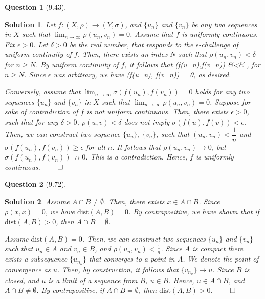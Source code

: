 \documentclass{article} %
\def\eQb#1\eQe{\begin{eqnarray*}#1\end{eqnarray*}}
\theoremstyle{quest}
\newtheorem*{question}{Question}
\newtheorem*{solution}{Solution}
\begin{document}
\begin{question}[9.43]
\end{question}
\begin{solution}
Let $f:(X,\rho ) \to (Y, \sigma)$,
and $\{ u_n \}$ and 
$\{ v_n \}$ be any two sequences in $X$ such that $\lim_{n\to \infty}
\rho (u_n , v_n) = 0$. Assume that $f$ is uniformly continuous.
Fix $\epsilon > 0$. Let $\delta > 0$ be the real number, that
responds to the $\epsilon$-challenge of uniform continuity of $f$.
Then, there exists an index $N$ such that 
$\rho(u_n, v_n) < \delta$ for $n \geq N$. 
By uniform continuity of $f$, it follows that
\eQb
\sigma(f(u_n),f(v_n)) &<& \epsilon,
\eQe
for $n \geq N$. Since $\epsilon$ was arbitrary, we have
\eQb
\underset{n \to \infty}{\lim} \sigma(f(u_n), f(v_n)) = 0,
\eQe
as desired. 

\smallskip

Conversely, assume that $\lim_{n \to \infty}
\sigma(f(u_n),f(v_n)) = 0$ holds for any two sequences 
$\{u_n\}$ and $\{ v_n \}$ in $X$ such that $\lim_{n \to \infty}
\rho(u_n,v_n) = 0$. 
Suppose for sake of contradiction of $f$ is not uniform continuous. 
Then, there exists $\epsilon > 0$, such that for any $\delta > 0$,
$\rho(u,v) < \delta$ does not imply  $\sigma(f(u),f(v)) < \epsilon$. 
Then, we can construct two sequence $\{u_n\}$, $\{v_n\}$, such that 
$(u_n, v_n) < \dfrac{1}{n}$ and $\sigma(f(u_n),f(v_n)) \geq \epsilon$
for all $n$. It follows that $\rho(u_n,v_n) \to 0$, but 
$\sigma(f(u_n),f(v_n)) \nrightarrow 0$. This is a contradiction.
Hence, $f$ is uniformly continuous. \hfill $\qed$  \\

\end{solution}

\bigskip

\begin{question}[9.72]
\end{question}
\begin{solution}
Assume $A \cap B \neq \emptyset$. Then, there exists $x \in A \cap B$.
Since $\rho(x,x) = 0$, we have $\text{dist}(A,B) = 0$. By contrapositive,
we have shown that if $\text{dist}(A,B) > 0$, then $A \cap B = \emptyset$. \\

\smallskip

Assume $\text{dist}(A,B) = 0$. Then, we can construct two sequences 
$\{u_n\}$ and $\{v_n\}$ such that  $u_n \in A$
and $v_n \in B$, and $\rho(u_n, v_n) < \frac{1}{n}$. Since
$A$ is compact there exists a subsequence $\{u_{n_k}\}$ that converges 
to a point in $A$.
We denote the point of convergence as $u$. Then, by construction, 
it follows that
$\{ v_{n_k}\} \to u$. Since $B$ is closed, and $u$ is a limit 
of a sequence from $B$, $u \in B$. Hence, $u \in A \cap B$, and
$A \cap B \neq \emptyset$. By contrapositive, if $A \cap B = \emptyset$,
then $\text{dist}(A,B) > 0$. \hfill $\qed$

\end{solution}
\end{document}
